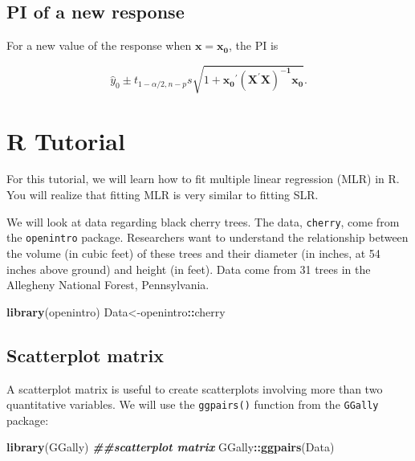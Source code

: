 \documentclass[
]{book}
\newenvironment{Shaded}{\begin{snugshade}}{\end{snugshade}}
\newcommand{\DocumentationTok}[1]{\textcolor[rgb]{0.56,0.35,0.01}{\textbf{\textit{#1}}}}
\newcommand{\FunctionTok}[1]{\textcolor[rgb]{0.13,0.29,0.53}{\textbf{#1}}}
\newcommand{\NormalTok}[1]{#1}
\newcommand{\OtherTok}[1]{\textcolor[rgb]{0.56,0.35,0.01}{#1}}
\newcommand{\SpecialCharTok}[1]{\textcolor[rgb]{0.81,0.36,0.00}{\textbf{#1}}}
\begin{document}
\hypertarget{pi-of-a-new-response-1}{%
\subsection{PI of a new response}\label{pi-of-a-new-response-1}}

For a new value of the response when \(\boldsymbol{x} = \boldsymbol{x_0}\), the PI is

\begin{equation} 
\hat{y}_0\pm t_{1-\alpha/2,n-p}s \sqrt{1+ \boldsymbol{x_0}^{\prime} \boldsymbol{(X^\prime X)^{-1}} \boldsymbol{x_0}}.
\label{eq:6pred}
\end{equation}

\hypertarget{r-tutorial-3}{%
\section{R Tutorial}\label{r-tutorial-3}}

For this tutorial, we will learn how to fit multiple linear regression (MLR) in R. You will realize that fitting MLR is very similar to fitting SLR.

We will look at data regarding black cherry trees. The data, \texttt{cherry}, come from the \texttt{openintro} package. Researchers want to understand the relationship between the volume (in cubic feet) of these trees and their diameter (in inches, at 54 inches above ground) and height (in feet). Data come from 31 trees in the Allegheny National Forest, Pennsylvania.

\begin{Shaded}
\begin{Highlighting}[]
\FunctionTok{library}\NormalTok{(openintro)}
\NormalTok{Data}\OtherTok{\textless{}{-}}\NormalTok{openintro}\SpecialCharTok{::}\NormalTok{cherry}
\end{Highlighting}
\end{Shaded}

\hypertarget{scatterplot-matrix}{%
\subsection*{Scatterplot matrix}\label{scatterplot-matrix}}

A scatterplot matrix is useful to create scatterplots involving more than two quantitative variables. We will use the \texttt{ggpairs()} function from the \texttt{GGally} package:

\begin{Shaded}
\begin{Highlighting}[]
\FunctionTok{library}\NormalTok{(GGally)}
\DocumentationTok{\#\#scatterplot matrix}
\NormalTok{GGally}\SpecialCharTok{::}\FunctionTok{ggpairs}\NormalTok{(Data)}
\end{Highlighting}
\end{Shaded}
\end{document}
